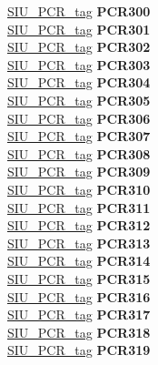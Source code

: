 \begin{DoxyCompactItemize}
\begin{tabbing}
\>\>\mbox{\hyperlink{unionSIU__tag_1_1SIU__PCR__tag}{SIU\_PCR\_tag}} {\bfseries PCR300}\\
\>\>\mbox{\hyperlink{unionSIU__tag_1_1SIU__PCR__tag}{SIU\_PCR\_tag}} {\bfseries PCR301}\\
\>\>\mbox{\hyperlink{unionSIU__tag_1_1SIU__PCR__tag}{SIU\_PCR\_tag}} {\bfseries PCR302}\\
\>\>\mbox{\hyperlink{unionSIU__tag_1_1SIU__PCR__tag}{SIU\_PCR\_tag}} {\bfseries PCR303}\\
\>\>\mbox{\hyperlink{unionSIU__tag_1_1SIU__PCR__tag}{SIU\_PCR\_tag}} {\bfseries PCR304}\\
\>\>\mbox{\hyperlink{unionSIU__tag_1_1SIU__PCR__tag}{SIU\_PCR\_tag}} {\bfseries PCR305}\\
\>\>\mbox{\hyperlink{unionSIU__tag_1_1SIU__PCR__tag}{SIU\_PCR\_tag}} {\bfseries PCR306}\\
\>\>\mbox{\hyperlink{unionSIU__tag_1_1SIU__PCR__tag}{SIU\_PCR\_tag}} {\bfseries PCR307}\\
\>\>\mbox{\hyperlink{unionSIU__tag_1_1SIU__PCR__tag}{SIU\_PCR\_tag}} {\bfseries PCR308}\\
\>\>\mbox{\hyperlink{unionSIU__tag_1_1SIU__PCR__tag}{SIU\_PCR\_tag}} {\bfseries PCR309}\\
\>\>\mbox{\hyperlink{unionSIU__tag_1_1SIU__PCR__tag}{SIU\_PCR\_tag}} {\bfseries PCR310}\\
\>\>\mbox{\hyperlink{unionSIU__tag_1_1SIU__PCR__tag}{SIU\_PCR\_tag}} {\bfseries PCR311}\\
\>\>\mbox{\hyperlink{unionSIU__tag_1_1SIU__PCR__tag}{SIU\_PCR\_tag}} {\bfseries PCR312}\\
\>\>\mbox{\hyperlink{unionSIU__tag_1_1SIU__PCR__tag}{SIU\_PCR\_tag}} {\bfseries PCR313}\\
\>\>\mbox{\hyperlink{unionSIU__tag_1_1SIU__PCR__tag}{SIU\_PCR\_tag}} {\bfseries PCR314}\\
\>\>\mbox{\hyperlink{unionSIU__tag_1_1SIU__PCR__tag}{SIU\_PCR\_tag}} {\bfseries PCR315}\\
\>\>\mbox{\hyperlink{unionSIU__tag_1_1SIU__PCR__tag}{SIU\_PCR\_tag}} {\bfseries PCR316}\\
\>\>\mbox{\hyperlink{unionSIU__tag_1_1SIU__PCR__tag}{SIU\_PCR\_tag}} {\bfseries PCR317}\\
\>\>\mbox{\hyperlink{unionSIU__tag_1_1SIU__PCR__tag}{SIU\_PCR\_tag}} {\bfseries PCR318}\\
\>\>\mbox{\hyperlink{unionSIU__tag_1_1SIU__PCR__tag}{SIU\_PCR\_tag}} {\bfseries PCR319}\\

\end{tabbing}
\end{DoxyCompactItemize}
